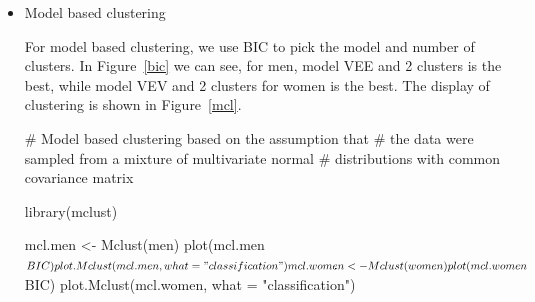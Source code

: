\documentclass{article}
\begin{document}
\begin{itemize}[leftmargin = 0 em]
\item Model based clustering

For model based clustering, we use BIC to pick the model and number of clusters. In Figure~\ref{bic} we can see, for men, model VEE and 2 clusters is the best, while model VEV and 2 clusters for women is the best. The display of clustering is shown in Figure~\ref{mcl}.

\begin{rcode}
#  Model based clustering based on the assumption that 
#  the data were sampled from a mixture of multivariate normal
#  distributions with common covariance matrix 

library(mclust)

mcl.men <- Mclust(men)
plot(mcl.men$BIC)
plot.Mclust(mcl.men, what = "classification")

mcl.women <- Mclust(women)
plot(mcl.women$BIC)
plot.Mclust(mcl.women, what = "classification")
\end{rcode}


\end{itemize}
\end{document}

